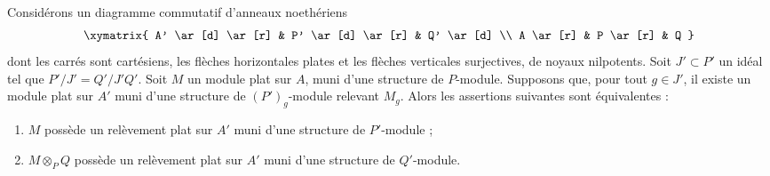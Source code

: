 \begin{lemma}
\label{lemma-lift-equivalence-module}
Considérons un diagramme commutatif d'anneaux noethériens
$$
\xymatrix{
A' \ar[d] \ar[r] &
P' \ar[d] \ar[r] &
Q' \ar[d] \\
A \ar[r] &
P \ar[r] &
Q
}
$$
dont les carrés sont cartésiens, les flèches horizontales plates et les
flèches verticales surjectives, de noyaux nilpotents.
Soit $J' \subset P'$ un idéal tel que $P'/J' = Q'/J'Q'$.
Soit $M$ un module plat sur $A$, muni d'une structure de $P$-module.
Supposons que, pour tout $g \in J'$, il existe un module plat sur $A'$ muni d'une structure de $(P')_g$-module
relevant $M_g$. Alors les assertions suivantes sont équivalentes :
\begin{enumerate}
\item $M$ possède un relèvement plat sur $A'$ muni d'une structure de $P'$-module ;
\item $M \otimes_P Q$ possède un relèvement plat sur $A'$ muni d'une structure de $Q'$-module.
\end{enumerate}
\end{lemma}

